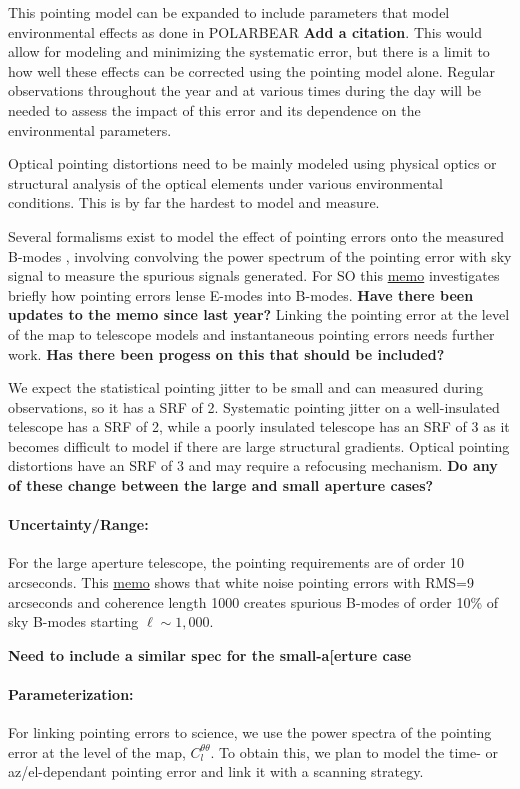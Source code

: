 This pointing model can be expanded to include parameters that model environmental effects as done in POLARBEAR \textbf{Add a citation}. This would allow for modeling and minimizing the systematic error, but there is a limit to how well these effects can be corrected using the pointing model alone. Regular observations throughout the year and at various times during the day will be needed to assess the impact of this error and its dependence on the environmental parameters.

Optical pointing distortions need to be mainly modeled using physical optics or structural analysis of the optical elements under various environmental conditions. This is by far the hardest to model and measure.

Several formalisms exist to model the effect of pointing errors onto the measured B-modes \cite{hu03, Shimon_2008}, involving convolving the power spectrum of the pointing error with sky signal to measure the spurious signals generated. For SO this \href{http://simonsobservatory.wdfiles.com/local--files/calandsys-telecon/eb_leakage_from_pointing_error.pdf?ukey=61f26ef33e8439a4e7096ab52c54c523066a4e35}{memo} investigates briefly how pointing errors lense E-modes into B-modes. \textbf{Have there been updates to the memo since last year?} Linking the pointing error at the level of the map to telescope models and instantaneous pointing errors needs further work. \textbf{Has there been progess on this that should be included?}

We expect the statistical pointing jitter to be small and can measured during observations, so it has a SRF of 2. Systematic pointing jitter on a well-insulated telescope has a SRF of 2, while a poorly insulated telescope has an SRF of 3 as it becomes difficult to model if there are large structural gradients. Optical pointing distortions have an SRF of 3 and may require a refocusing mechanism. \textbf{Do any of these change between the large and small aperture cases?}

\paragraph{Uncertainty/Range:}
For the large aperture telescope, the pointing requirements are of order 10 arcseconds.
This \href{http://simonsobservatory.wdfiles.com/local--files/calandsys-telecon/eb_leakage_from_pointing_error.pdf?ukey=61f26ef33e8439a4e7096ab52c54c523066a4e35}{memo} shows that white noise pointing errors with RMS=9 arcseconds and coherence length 1000 creates spurious B-modes of order 10\% of sky B-modes starting $\ell \sim 1,000$.

\textbf{Need to include a similar spec for the small-a[erture case}


\paragraph{Parameterization:}
For linking pointing errors to science, we use the power spectra of the pointing error at the level of the map, $C_l^{\theta \theta}$. To obtain this, we plan to model the time- or az/el-dependant pointing error and link it with a scanning strategy.
